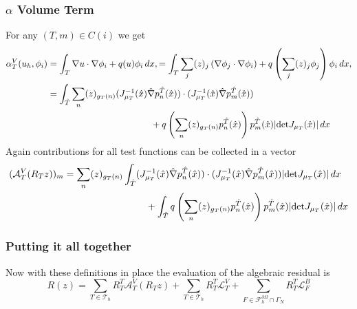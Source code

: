 \documentclass[a4paper,12pt]{article}
\begin{document}
\subsubsection*{$\alpha$ Volume Term}

For any $(T,m)\in C(i)$ we get
\begin{equation*}
\begin{split}
\alpha_T^V(u_h,\phi_i) &= \int_T \nabla u \cdot \nabla \phi_i + q(u) \phi_i \,dx,
= \int_T \sum_j (z)_j \left(\nabla \phi_j \cdot \nabla \phi_i \right)
+ q\left( \sum_j (z)_j \phi_j \right) \phi_i \,dx,\\
&= \int_{\hat T} \sum_{n} (z)_{g_T(n)} (J_{\mu_T}^{-1}(\hat x) \hat\nabla p_n^{\hat T}(\hat x) )
\cdot (J_{\mu_T}^{-1}(\hat x) \hat\nabla p_m^{\hat T}(\hat x) ) \\
&\hspace{40mm}+ q\left( \sum_n (z)_{g_T(n)} p_n^{\hat T}(\hat x) \right) p_m^{\hat T}(\hat x)
|\text{det} J_{\mu_T}(\hat x)| \,dx
\end{split}
\end{equation*}
Again contributions for all test functions can be collected in a vector
\begin{equation*}
\begin{split}
(\mathcal{A}_T^V(R_T z))_m &=
\sum_{n} (z)_{g_T(n)} \int_{\hat T} (J_{\mu_T}^{-1}(\hat x) \hat\nabla p_n^{\hat T}(\hat x) )
\cdot (J_{\mu_T}^{-1}(\hat x) \hat\nabla p_m^{\hat T}(\hat x) ) |\text{det} J_{\mu_T}(\hat x)| \,dx\\
&\hspace{30mm}+ \int_{\hat T} q\left( \sum_n (z)_{g_T(n)} p_n^{\hat T}(\hat x) \right) p_m^{\hat T}(\hat x)
|\text{det} J_{\mu_T}(\hat x)| \,dx
\end{split}
\end{equation*}


\subsubsection*{Putting it all together}

Now with these definitions in place the evaluation of the algebraic residual is
\begin{equation}
R(z) =
\sum_{T\in\mathcal{T}_h} R_T^T \mathcal{A}_T^V(R_T z)
  + \sum_{T\in\mathcal{T}_h} R_T^T \mathcal{L}_T^V
 + \sum_{F\in\mathcal{F}_h^{\partial\Omega}\cap\Gamma_N} R_T^T \mathcal{L}_F^B
\label{eq:FinalResidualEvaluation}
\end{equation}
\end{document}

